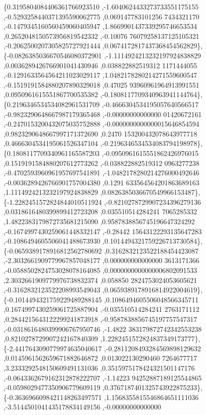 \begin{DoxyCode}
\{0.3195804084406361766923510 ,-1.6040624433273733551175155 ,-0.5293258440371395590062775 ,0.069147783101256
      7434321170 ,-0.1479345160560459060405947 ,1.8669901437339295746653534 ,0.2652048150573956819542332 ,-0.10076
      76079258137125105321 ,-0.2062500207305825727921444 ,0.0674172817437368454562829\},
\{-0.0826385036670546080372901 ,-1.1114924213232197924838829 ,0.0036289426766901041430946 ,0.038822882519312
      1171444055 ,-0.1291633564564211023029117 ,1.0482178280214271559600547 ,-0.1519191584880207890329018 ,0.47025
      93960961964913991551 ,0.0950961615551867700535382 ,-0.1808117709340963941144764\},
\{0.2196346534534082961531709 ,-0.4666304534195057640566517 ,-0.9823290648667987179365468 ,-0.00000000000000
      01420672161 ,-0.2470153200432075035752888 ,-0.0000000000000015646854594 ,0.9823290648667997171372690 ,0.2470
      153200432078643977718 ,0.4666304534195061526347104 ,-0.2196346534534083794198978\},
\{0.1808117709340961165587203 ,-0.0950961615551862426976015 ,0.1519191584880207612773262 ,-0.038822882519312
      0963277238 ,-0.4702593960961957697541891 ,-1.0482178280214276000492646 ,-0.0036289426766901757004380 ,0.1291
      633564564201863689163 ,1.1114924213232197924838829 ,0.0826385036670549966153487\},
\{-1.2282451572824844010511924 ,-0.8210278729907234396279136 ,0.0318616480399899412723208 ,0.035510514284241
      7065285332 ,1.4822383179872735681215090 ,0.9587838856745196647324292 ,-0.1674997430259061448332147 ,-0.28442
      15643122293135647283 ,-0.1086494605506041488673930 ,0.1014494321759226713730584\},
\{-0.0659389178916812562780692 ,0.3162832123522188454423087 ,-2.3032661909779967857048177 ,0.000000000000000
      3613171366 ,-0.0588502824753028078164085 ,0.0000000000000006802091533 ,2.3032661909779976738832374 ,0.058850
      2824753024053605621 ,-0.3162832123522208993549043 ,0.0659389178916814922004619\},
\{-0.1014494321759229489288145 ,0.1086494605506048566345711 ,0.1674997430259061725887904 ,-0.035510514284241
      2763171112 ,0.2844215643122299241873918 ,-0.9587838856745197757547317 ,-0.0318616480399906767950746 ,-1.4822
      383179872742342553238 ,0.8210278729907242167840309 ,1.2282451572824837349173777\},
\{-2.4417643090779974635040617 ,-0.2811208493284569898129632 ,0.0145961562659671882646872 ,0.013022130290460
      7264677717 ,3.2333292548150609491131036 ,0.3515975178424321501147176 ,-0.0643362679162312878222707 ,-1.14223
      94252887189125544865 ,-0.0598029477350906779609119 ,0.3767187401325743922875233\},
\{-0.3636966098421148263497571 ,1.1568355815546864651111036 ,-3.5144501041435178834149156 ,-0.00000000000000

\end{DoxyCode}
